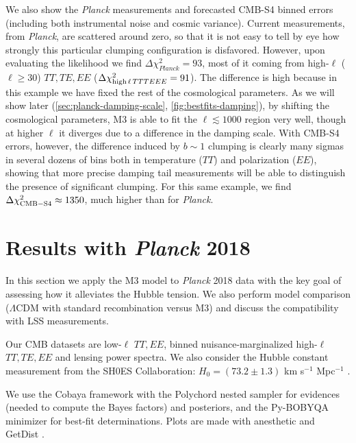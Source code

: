 We also show the {\it Planck} measurements and forecasted CMB-S4 binned errors (including both instrumental noise and cosmic variance).
Current measurements, from {\it Planck}, are scattered around zero, so that it is not easy to tell by eye how strongly this particular clumping configuration is disfavored. 
However, upon evaluating the likelihood we find $\Delta\chi^2_{Planck}=93$, most of it coming from high-$\ell$ ($\ell\ge 30$) $TT,TE,EE$ ($\Delta\chi^2_{{\rm high}\,\ell\,TTTEEE}=91$).
The difference is high because in this example we have fixed the rest of the cosmological parameters.
As we will show later (\cref{sec:planck-damping-scale}, \cref{fig:bestfits-damping}), by shifting the cosmological parameters, M3 is able to fit the $\ell\lesssim 1000$ region very well, though at higher $\ell$ it diverges due to a difference in the damping scale.
With CMB-S4 errors, however, the difference induced by $b\sim 1$ clumping is clearly many sigmas in several dozens of bins both in temperature ($TT$) and polarization ($EE$), showing that more precise damping tail measurements will be able to distinguish the presence of significant clumping.
For this same example, we find $\Delta\chi^2_{\rm CMB-S4}\approx 1350$, much higher than for {\it Planck}.

\section{Results with {\it Planck} 2018}
\label{sec:planck}

In this section we apply the M3 model to {\it Planck} 2018 data with the key goal of assessing how it alleviates the Hubble tension.
We also perform model comparison ($\Lambda$CDM with standard recombination versus M3) and discuss the compatibility with LSS measurements.

Our CMB datasets are low-$\ell$ $TT,EE$, binned nuisance-marginalized high-$\ell$ $TT,TE,EE$ \citep{planck_ttee} and lensing \citep{planck_lensing} power spectra.
We also consider the Hubble constant measurement from the SH0ES Collaboration: $H_0=\left( 73.2\pm 1.3 \right)$ km s$^{-1}$ Mpc$^{-1}$ \citep{SH0ES}.

We use the Cobaya framework \citep{cobaya} with the Polychord nested sampler \citep{polychord1,polychord2} for evidences (needed to compute the Bayes factors) and posteriors, and the Py-BOBYQA minimizer \citep{pybobyqa1,pybobyqa2,pybobyqa3} for best-fit determinations. Plots are made with anesthetic \citep{anesthetic} and GetDist \citep{getdist}.

